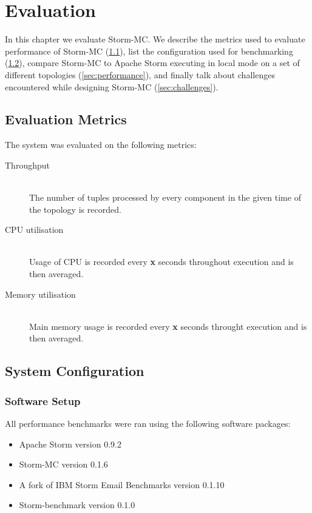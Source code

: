 \chapter{Evaluation}

In this chapter we evaluate Storm-MC. We describe the metrics used to evaluate performance of Storm-MC (\ref{sec:metrics}), list the configuration used for benchmarking (\ref{sec:system_conf}), compare Storm-MC to Apache Storm executing in local mode on a set of different topologies (\ref{sec:performance}), and finally talk about challenges encountered while designing Storm-MC (\ref{sec:challenges}).

\section{Evaluation Metrics}
\label{sec:metrics}

The system was evaluated on the following metrics:

\begin{description}
	\item[Throughput] \hfill \\
	The number of tuples processed by every component in the given time of the topology is recorded.
	\item[CPU utilisation] \hfill \\
	Usage of CPU is recorded every \textbf{x} seconds throughout execution and is then averaged.
	\item[Memory utilisation] \hfill \\
	Main memory usage is recorded every \textbf{x} seconds throught execution and is then averaged.
\end{description}

\section{System Configuration}
\label{sec:system_conf}

\subsection{Software Setup}


All performance benchmarks were ran using the following software packages:

\begin{itemize}
	\item Apache Storm version 0.9.2
	\item Storm-MC version 0.1.6
	\item A fork of IBM Storm Email Benchmarks version 0.1.10
	\item Storm-benchmark version 0.1.0
\end{itemize}

